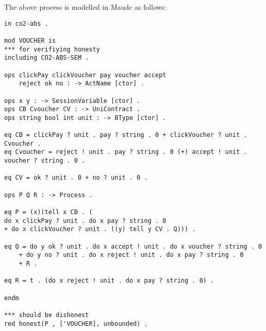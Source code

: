The above process is modelled in Maude as follows:
\begin{lstlisting}[language=maude]
in co2-abs .

mod VOUCHER is
*** for verifiying honesty
including CO2-ABS-SEM .

ops clickPay clickVoucher pay voucher accept 
    reject ok no : -> ActName [ctor] .

ops x y : -> SessionVariable [ctor] .
ops CB Cvoucher CV : -> UniContract .
ops string bool int unit : -> BType [ctor] .

eq CB = clickPay ? unit . pay ? string . 0 + clickVoucher ? unit . Cvoucher .
eq Cvoucher = reject ! unit . pay ? string . 0 (+) accept ! unit . voucher ? string . 0 .

eq CV = ok ? unit . 0 + no ? unit . 0 .

ops P Q R : -> Process .  

eq P = (x)(tell x CB . (
do x clickPay ? unit . do x pay ? string . 0 
+ do x clickVoucher ? unit . ((y) tell y CV . Q))) .

eq Q = do y ok ? unit . do x accept ! unit . do x voucher ? string . 0 
    + do y no ? unit . do x reject ! unit . do x pay ? string . 0     
    + R .

eq R = t . (do x reject ! unit . do x pay ? string . 0) .

endm

*** should be dishonest
red honest(P , ['VOUCHER], unbounded) .
\end{lstlisting}

